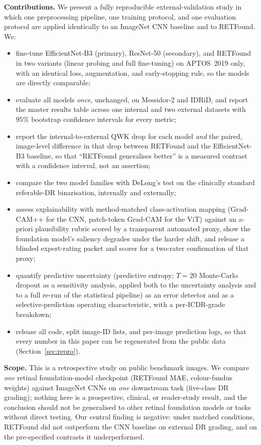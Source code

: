 \documentclass[journal]{IEEEtran}
\begin{document}
\textbf{Contributions.} We present a fully reproducible external-validation study
in which one preprocessing pipeline, one training protocol, and one evaluation
protocol are applied identically to an ImageNet CNN baseline and to RETFound. We:
\begin{itemize}
  \item fine-tune EfficientNet-B3 (primary), ResNet-50 (secondary), and RETFound
    in two variants (linear probing and full fine-tuning) on APTOS~2019 only,
    with an identical loss, augmentation, and early-stopping rule, so the models
    are directly comparable;
  \item evaluate all models \emph{once}, unchanged, on Messidor-2 and IDRiD, and
    report the master results table across one internal and two external datasets
    with $95\%$ bootstrap confidence intervals for every metric;
  \item report the internal-to-external QWK drop for each model \emph{and} the
    paired, image-level difference in that drop between RETFound and the
    EfficientNet-B3 baseline, so that ``RETFound generalises better'' is a
    measured contrast with a confidence interval, not an assertion;
  \item compare the two model families with DeLong's test on the clinically
    standard referable-DR binarisation, internally and externally;
  \item assess explainability with method-matched class-activation mapping
    (Grad-CAM++ for the CNN, patch-token Grad-CAM for the ViT) against an
    a-priori plausibility rubric scored by a transparent automated proxy, show
    the foundation model's saliency degrades under the harder shift, and release
    a blinded expert-rating packet and scorer for a two-rater confirmation of
    that proxy;
  \item quantify predictive uncertainty (predictive entropy; $T=20$ Monte-Carlo
    dropout as a sensitivity analysis, applied both to the uncertainty analysis
    and to a full re-run of the statistical pipeline) as an error detector and as
    a selective-prediction operating characteristic, with a per-ICDR-grade
    breakdown;
  \item release all code, split image-ID lists, and per-image prediction logs, so
    that every number in this paper can be regenerated from the public data
    (Section~\ref{sec:repro}).
\end{itemize}

\textbf{Scope.} This is a retrospective study on public benchmark images. We
compare \emph{one} retinal foundation-model checkpoint (RETFound MAE,
colour-fundus weights) against ImageNet CNNs on \emph{one} downstream task
(five-class DR grading); nothing here is a prospective, clinical, or reader-study
result, and the conclusion should not be generalised to other retinal foundation
models or tasks without direct testing. Our central finding is negative: under
matched conditions, RETFound did not outperform the CNN baseline on external DR
grading, and on the pre-specified contrasts it underperformed.
\end{document}
